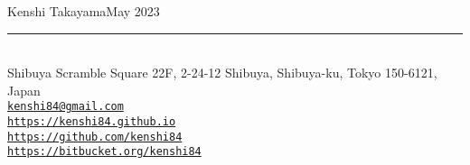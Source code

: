 {\Large\sc Kenshi Takayama}\hfill May 2023
\rule{\textwidth}{1pt}\\
{\small
Shibuya Scramble Square 22F, 2-24-12 Shibuya, Shibuya-ku, Tokyo 150-6121, Japan\\
\href{mailto:kenshi84@gmail.com}{{\tt kenshi84@gmail.com}}\\
\href{https://kenshi84.github.io}{{\tt https://kenshi84.github.io}}\\
\href{https://github.com/kenshi84}{{\tt https://github.com/kenshi84}}\\
\href{https://bitbucket.org/kenshi84}{{\tt https://bitbucket.org/kenshi84}}
}
\vspace{2mm}
